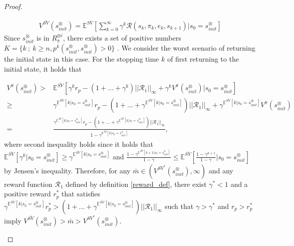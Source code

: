 \documentclass[10pt]{article}
\newtheorem{proof}{Proof}
\begin{document}
\begin{proof}
\begin{enumerate}
  \begin{align}
    V^{\bar{SV}}(s^{\otimes}_{init}) = \mathbb{E}^{SV}[ {\sum_{k=0}^{\infty}} \gamma^k \mathcal{R}(s_k, \pi_k, e_k, s_{k+1}) | s_0 = s^{\otimes}_{init} ]
  \end{align}
    Since $s^{\otimes}_{init}$ is in $R^{\otimes i}_{\bar{\pi}}$, there exists a set of positive numbers $K = \{ k\ ;\ k \geq n, p^{k}(s^{\otimes}_{init}, s^{\otimes}_{init}) > 0 \}$ \cite{ESS}. We consider the worst scenario of returning the initial state in this case. For the stopping time $k$ of first returning to the initial state, it holds that

    \begin{align}
      V^{\bar{\pi}}(s^{\otimes}_{init})
       > & \mathbb{E}^{\bar{SV}} [ \gamma^k r_p - (1 + \ldots + \gamma^k) ||\mathcal{R}_1||_{\infty} + \gamma^k V^{\bar{\pi}}(s^{\otimes}_{init}) | s_0 = s^{\otimes}_{init} ] \nonumber \\
       \geq & \gamma^{\mathbb{E}^{\bar{SV}}[k | s_0 = s^{\otimes}_{init} ]} r_p - (1 + \ldots + \gamma^{\mathbb{E}^{\bar{SV}}[k | s_0 = s^{\otimes}_{init} ]} ) ||\mathcal{R}_1||_{\infty} + \gamma^{\mathbb{E}^{\bar{SV}}[k | s_0 = s^{\otimes}_{init} ]} V^{\bar{\pi}}(s^{\otimes}_{init}) \nonumber \\
       = & \frac{ \gamma^{\mathbb{E}^{\bar{SV}}[k | s_0 = s^{\otimes}_{init} ]} r_p - (1 + \ldots + \gamma^{\mathbb{E}^{\bar{SV}}[k | s_0 = s^{\otimes}_{init} ]} ) ||\mathcal{R}_1||_{\infty} } { 1 - \gamma^{\mathbb{E}^{\bar{SV}}[k | s_0 = s^{\otimes}_{init} ]}}, \nonumber
    \end{align}
 where second inequality holds since it holds that $\mathbb{E}^{\bar{SV}} [ \gamma^k | s_0 = s^{\otimes}_{init} ] \geq \gamma^{\mathbb{E}^{\bar{SV}}[k | s_0 = s^{\otimes}_{init} ]}$ and $ \frac{1 - \gamma^{\mathbb{E}^{\bar{SV}} [ {k+1} | s_0 = s^{\otimes}_{init} ]}}{1 - \gamma} \leq \mathbb{E}^{\bar{SV}} [ \frac{1 - \gamma^{k+1}}{1 - \gamma} | s_0 = s^{\otimes}_{init} ]$ by Jensen's inequality.
  Therefore, for any $\bar{m} \in (V^{SV^{\ast}}(s^{\otimes}_{init}), \infty)$ and any reward function $\mathcal{R}_1$ defined by definition \ref{reward_def}, there exist $\gamma^{\ast} < 1$ and a positive reward $r^{\ast}_p$ that satisfies $\gamma^{\mathbb{E}^{\bar{SV}}[k | s_0 = s^{\otimes}_{init} ]} r^{\ast}_p > (1 + \ldots + \gamma^{\mathbb{E}^{\bar{SV}}[k | s_0 = s^{\otimes}_{init} ]} ) ||\mathcal{R}_1||_{\infty}$ such that $\gamma > \gamma^{\ast} $ and $r_p > r^{\ast}_p$ imply $V^{\bar{SV}}(s^{\otimes}_{init}) > \bar{m} > V^{SV^{\ast}}(s^{\otimes}_{init})$.


\end{enumerate}
\end{proof}
\end{document}
